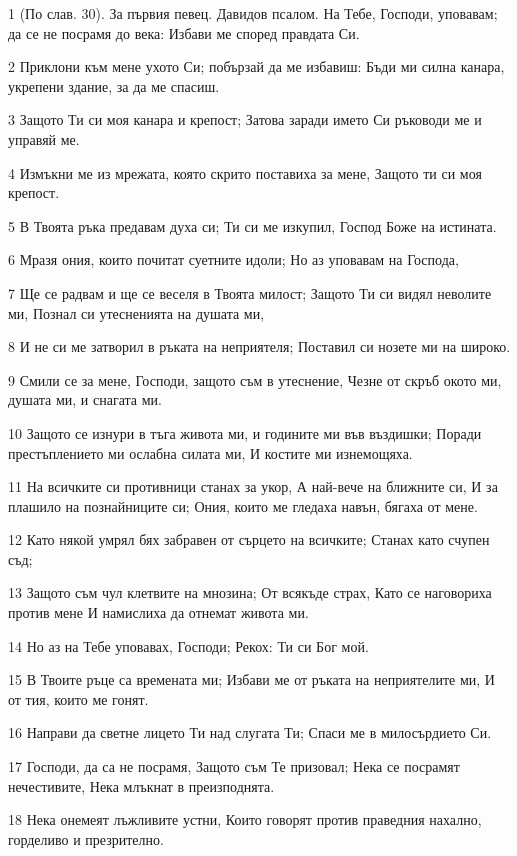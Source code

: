 \par 1 (По слав. 30). За първия певец. Давидов псалом. На Тебе, Господи, уповавам; да се не посрамя до века: Избави ме според правдата Си.
\par 2 Приклони към мене ухото Си; побързай да ме избавиш: Бъди ми силна канара, укрепени здание, за да ме спасиш.
\par 3 Защото Ти си моя канара и крепост; Затова заради името Си ръководи ме и управяй ме.
\par 4 Измъкни ме из мрежата, която скрито поставиха за мене, Защото ти си моя крепост.
\par 5 В Твоята ръка предавам духа си; Ти си ме изкупил, Господ Боже на истината.
\par 6 Мразя ония, които почитат суетните идоли; Но аз уповавам на Господа,
\par 7 Ще се радвам и ще се веселя в Твоята милост; Защото Ти си видял неволите ми, Познал си утесненията на душата ми,
\par 8 И не си ме затворил в ръката на неприятеля; Поставил си нозете ми на широко.
\par 9 Смили се за мене, Господи, защото съм в утеснение, Чезне от скръб окото ми, душата ми, и снагата ми.
\par 10 Защото се изнури в тъга живота ми, и годините ми във въздишки; Поради престъплението ми ослабна силата ми, И костите ми изнемощяха.
\par 11 На всичките си противници станах за укор, А най-вече на ближните си, И за плашило на познайниците си; Ония, които ме гледаха навън, бягаха от мене.
\par 12 Като някой умрял бях забравен от сърцето на всичките; Станах като счупен съд;
\par 13 Защото съм чул клетвите на мнозина; От всякъде страх, Като се наговориха против мене И намислиха да отнемат живота ми.
\par 14 Но аз на Тебе уповавах, Господи; Рекох: Ти си Бог мой.
\par 15 В Твоите ръце са времената ми; Избави ме от ръката на неприятелите ми, И от тия, които ме гонят.
\par 16 Направи да светне лицето Ти над слугата Ти; Спаси ме в милосърдието Си.
\par 17 Господи, да са не посрамя, Защото съм Те призовал; Нека се посрамят нечестивите, Нека млъкнат в преизподнята.
\par 18 Нека онемеят лъжливите устни, Които говорят против праведния нахално, горделиво и презрително.
